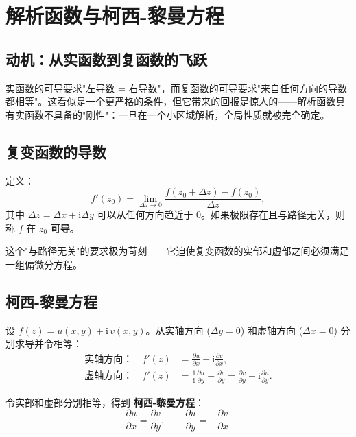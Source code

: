 \section{解析函数与柯西-黎曼方程}
\label{sec:cauchy_riemann}

\subsection*{动机：从实函数到复函数的飞跃}

实函数的可导要求"左导数 = 右导数"，而复函数的可导要求"来自任何方向的导数都相等"。这看似是一个更严格的条件，但它带来的回报是惊人的——解析函数具有实函数不具备的"刚性"：一旦在一个小区域解析，全局性质就被完全确定。

\subsection{复变函数的导数}

定义：
\begin{equation}
f'(z_0) = \lim_{\Delta z\to 0}\frac{f(z_0+\Delta z) - f(z_0)}{\Delta z},
\end{equation}
其中 $\Delta z = \Delta x + \mathrm{i}\Delta y$ 可以从任何方向趋近于 $0$。如果极限存在且与路径无关，则称 $f$ 在 $z_0$ \textbf{可导}。

这个"与路径无关"的要求极为苛刻——它迫使复变函数的实部和虚部之间必须满足一组偏微分方程。

\subsection{柯西-黎曼方程}

设 $f(z) = u(x,y) + \mathrm{i}\,v(x,y)$。从实轴方向 ($\Delta y=0$) 和虚轴方向 ($\Delta x=0$) 分别求导并令相等：
\begin{align}
\text{实轴方向：}\quad f'(z) &= \frac{\partial u}{\partial x} + \mathrm{i}\frac{\partial v}{\partial x},\\
\text{虚轴方向：}\quad f'(z) &= \frac{1}{\mathrm{i}}\frac{\partial u}{\partial y} + \frac{\partial v}{\partial y}
= \frac{\partial v}{\partial y} - \mathrm{i}\frac{\partial u}{\partial y}.
\end{align}

令实部和虚部分别相等，得到 \textbf{柯西-黎曼方程}：
\begin{equation}
\boxed{\;\frac{\partial u}{\partial x} = \frac{\partial v}{\partial y},\qquad
\frac{\partial u}{\partial y} = -\frac{\partial v}{\partial x}\;}.
\label{eq:cauchy_riemann}
\end{equation}

